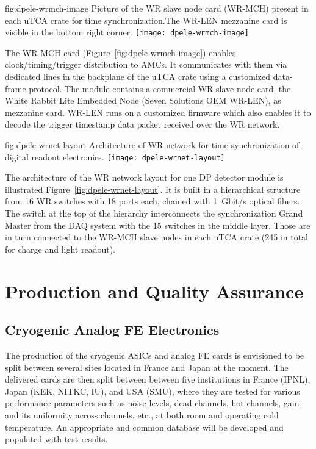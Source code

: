 \begin{dunefigure}{fig:dpele-wrmch-image}
{Picture of the WR slave node card (WR-MCH) present in each uTCA crate for time synchronization.The WR-LEN mezzanine card is visible in the bottom right corner.}
\texttt{[image: dpele-wrmch-image]}
\end{dunefigure}

The WR-MCH card (Figure~\ref{fig:dpele-wrmch-image}) enables clock/timing/trigger distribution to AMCs. It communicates with them via dedicated lines in the backplane of the uTCA crate using a customized data-frame protocol. The module contains a commercial WR slave node card, the White Rabbit Lite Embedded Node (Seven Solutions OEM WR-LEN), as mezzanine card. WR-LEN runs on a customized firmware which also enables it to decode the trigger timestamp data packet received over the WR network.

\begin{dunefigure}{fig:dpele-wrnet-layout}
{Architecture of WR network for time synchronization of digital readout electronics.}
\texttt{[image: dpele-wrnet-layout]}
\end{dunefigure}

The architecture of the WR network layout for one DP detector module is illustrated Figure~\ref{fig:dpele-wrnet-layout}. It is built in a hierarchical structure from \num{16} WR switches with \num{18} ports each,  chained with \SI{1}{Gbit/s} optical fibers. The switch at the top of the hierarchy interconnects the synchronization Grand Master from the DAQ system with the \num{15} switches in the middle layer. Those are in turn connected to the WR-MCH slave nodes in each uTCA crate (245 in total for charge and light readout). 



\section{Production and Quality Assurance}
\label{sec:fddp-tpc-elec-prod-assy}

\subsection{Cryogenic Analog FE Electronics}
\label{sec:fddp-tpc-elec-prod-fe}
The production of the cryogenic ASICs and analog FE cards is envisioned to be split between several sites located in France and Japan at the moment. The delivered cards are then split between between five institutions in France (IPNL), Japan (KEK, NITKC, IU), and USA (SMU), where they are tested for various performance parameters such as noise levels, dead channels, hot channels, gain and its uniformity across channels, etc., at both room and operating cold temperature. An appropriate and common database will be developed and populated with test results. 

